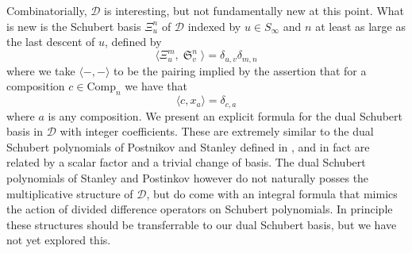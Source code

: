 \documentclass{amsart}
\theoremstyle{definition}
\theoremstyle{remark}
\numberwithin{equation}{subsection}
\DeclareMathOperator{\sch}{\mathfrak{S}}
\newcommand{\dsch}{\ensuremath{\Xi}}
\newcommand{\dcoma}{\mathcal{D}}
\begin{document}
Combinatorially, $\dcoma$ is interesting, but not fundamentally new at this point. What is new is the Schubert basis $\dsch_u^n$ of $\dcoma$ indexed by $u\in S_\infty$ and $n$ at least as large as the last descent of $u$, defined by
$$\langle \dsch_u^m, \sch_v^n\rangle = \delta_{u,v}\delta_{m,n}$$
where we take $\langle -,-\rangle$ to be the pairing implied by the assertion that for a composition $c\in\mathrm{Comp}_n$ we have that
$$\langle c, x_a\rangle = \delta_{c,a}$$
where $a$ is any composition. We present an explicit formula for the dual Schubert basis in $\dcoma$ with integer coefficients. These are extremely similar to the dual Schubert polynomials of Postnikov and Stanley defined in \cite{postnikov2009chains}, and in fact are related by a scalar factor and a trivial change of basis. The dual Schubert polynomials of Stanley and Postinkov however do not naturally posses the multiplicative structure of $\dcoma$, but do come with an integral formula that mimics the action of divided difference operators on Schubert polynomials. In principle these structures should be transferrable to our dual Schubert basis, but we have not yet explored this.

\end{document}
